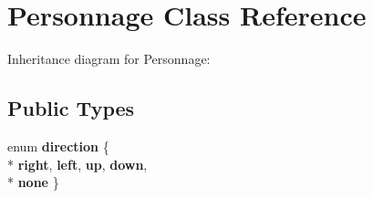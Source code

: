 \hypertarget{class_personnage}{}\section{Personnage Class Reference}
\label{class_personnage}


Inheritance diagram for Personnage\+:
\subsection*{Public Types}
\begin{DoxyCompactItemize}
\item 
\hypertarget{class_personnage_a4fd878262e17985fe2c4d59b5d816bd5}{}enum {\bfseries direction} \{ \\*
{\bfseries right}, 
{\bfseries left}, 
{\bfseries up}, 
{\bfseries down}, 
\\*
{\bfseries none}
 \}\label{class_personnage_a4fd878262e17985fe2c4d59b5d816bd5}

\end{DoxyCompactItemize}
